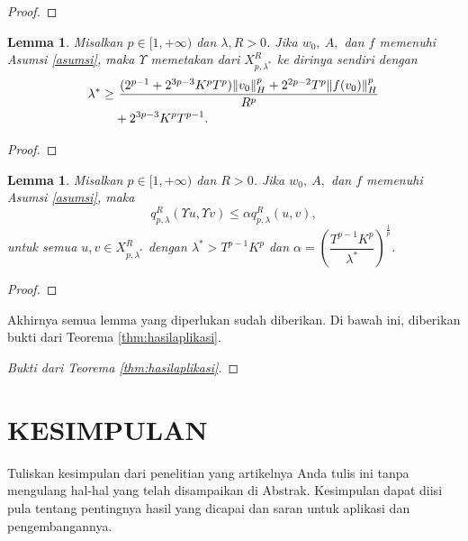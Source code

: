 \documentclass[journal]{IEEEtran}
\newtheorem{lemmas}[defn]{Lemma}
\theoremstyle{definition}
\theoremstyle{definition}
\theoremstyle{plain}
\newcommand{\qpl}{q^R_{p,\lambda}}
\begin{document}
\begin{proof}

\end{proof}

\begin{lemmas}\label{lemma:UpsilonXkeX}
    Misalkan $p\in[1,+\infty)$ dan $\lambda, R>0$. Jika $w_0,~A,$ dan $f$ memenuhi Asumsi \ref{asumsi}, maka $\Upsilon$ memetakan dari $X^R_{p,\lambda^*}$ ke dirinya sendiri dengan 
    \begin{align}
        \nonumber \lambda^*\geq &~\dfrac{(2^{p-1}+2^{3p-3}K^pT^p)\norm{v_0}^p_H +2^{2p-2}T^p\norm{f(v_0)}^p_H}{R^p} \\
        &+ 2^{3p-3}K^pT^{p-1}.\label{eq:ketaksamaanLambda1}
    \end{align}
\end{lemmas}

\begin{proof}

\end{proof}

\begin{lemmas}\label{lemma:qTu<qu}
    Misalkan $p\in [1,+\infty)$ dan $R>0$. Jika $w_0,~A,$ dan $f$ memenuhi Asumsi \ref{asumsi}, maka 
    \begin{equation}
        \qpl(\Upsilon u, \Upsilon v)\leq \alpha \qpl(u,v), 
    \end{equation}
    untuk semua $u,v\in X^R_{p,\lambda^*}$ dengan $\lambda^*>T^{p-1}K^p$ dan $\alpha = \left(\dfrac{T^{p-1}K^p}{\lambda^*}\right)^{\frac{1}{p}}$.
\end{lemmas}

\begin{proof}

\end{proof}
Akhirnya semua lemma yang diperlukan sudah diberikan. Di bawah ini, diberikan bukti dari Teorema \ref{thm:hasilaplikasi}.

\begin{proof}[Bukti dari Teorema \ref{thm:hasilaplikasi}]

\end{proof}




    \section{KESIMPULAN}
    Tuliskan kesimpulan dari penelitian yang artikelnya Anda tulis ini tanpa mengulang hal-hal yang telah disampaikan di Abstrak. Kesimpulan dapat diisi pula tentang pentingnya hasil yang dicapai dan saran untuk aplikasi dan pengembangannya.
\end{document}

